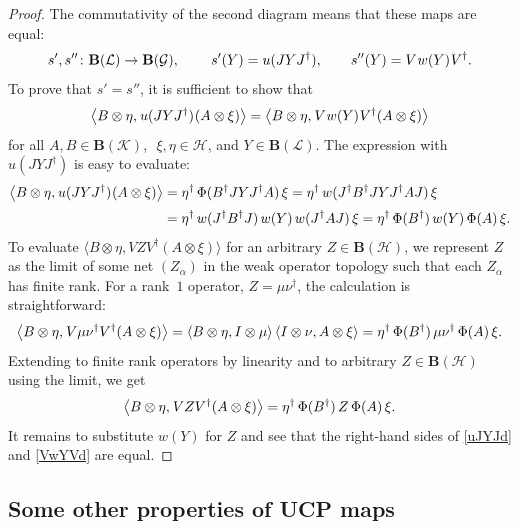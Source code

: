 \documentclass[12pt]{article}
\newcommand{\calG}{\mathcal{G}}
\newcommand{\calH}{\mathcal{H}}
\newcommand{\calK}{\mathcal{K}}
\newcommand{\calL}{\mathcal{L}}
\newcommand{\ts}{\mkern1mu}
\newcommand{\Bo}{\mathbf{B}}
\newcommand{\blangle}{\bigl\langle}
\newcommand{\brangle}{\bigr\rangle}
\newcommand*{\braket}[2]{\langle{#1},{#2}\rangle}
\newcommand*{\bbraket}[2]{\blangle{#1},\mkern1mu{#2}\brangle}
\newtheorem[definition]{Definition}[Theorem]{Definition}
\newtheorem[remark]{Example}[Theorem]{Example}
\newtheorem[remark]{Remark}[Theorem]{Remark}
\newtheorem[remark]{Question}[Theorem]{Open question}
\newtheorem*[definition]{definition}{Definition}
\newtheorem*[remark]{example}{Example}
\newtheorem*[remark]{remark}{Remark}
\newtheorem*[remark]{question}{Open question}
\numberwithin{equation}{section}
\begin{document}
\begin{proof}
The commutativity of the second diagram means that these maps are equal:
\begin{equation}
s',s''\colon \Bo(\calL)\to\Bo(\calG),\qquad\:
s'(Y)=u(JYJ^\dag),\qquad s''(Y)=V\ts w(Y)\ts V^\dag.
\end{equation}
To prove that $s'=s''$, it is sufficient to show that
\[
\bbraket{B\otimes\eta}{u(JYJ^\dag)\ts(A\otimes\xi)}
=\bbraket{B\otimes\eta}{V\ts w(Y)\ts V^\dag (A\otimes\xi)}
\]
for all $A,B\in\Bo(\calK)$,\,\, $\xi,\eta\in\calH$, and $Y\in\Bo(\calL)$. The expression with $u(JYJ^\dag)$ is easy to evaluate:
\begin{equation}\label{uJYJd}
\begin{aligned}
\bbraket{B\otimes\eta}{u(JYJ^\dag)\ts(A\otimes\xi)}
&=\eta^\dag\, \Phi(B^\dag JYJ^\dag A)\, \xi
=\eta^\dag\, w(J^\dag B^\dag JYJ^\dag A J)\, \xi\\[2pt]
&=\eta^\dag\, w(J^\dag B^\dag J)\, w(Y)\, w(J^\dag AJ)\, \xi
=\eta^\dag\, \Phi(B^\dag)\, w(Y)\, \Phi(A)\, \xi.
\end{aligned}
\end{equation}
To evaluate $\braket{B\otimes\eta}{VZV^\dag(A\otimes\xi)}$ for an arbitrary $Z\in\Bo(\calH)$, we represent $Z$ as the limit of some net $(Z_\alpha)$ in the weak operator topology such that each $Z_\alpha$ has finite rank. For a rank~$1$ operator, $Z=\mu\nu^\dag$, the calculation is straightforward:
\[
\bbraket{B\otimes\eta}{V\mu\nu^\dag V^\dag(A\otimes\xi)}
=\braket{B\otimes\eta}{I\otimes\mu}\,\braket{I\otimes\nu}{A\otimes\xi}
=\eta^\dag\,\Phi(B^\dag)\, \mu\nu^\dag\, \Phi(A)\,\xi.
\]
Extending to finite rank operators by linearity and to arbitrary $Z\in\Bo(\calH)$ using the limit, we get
\begin{equation}\label{VwYVd}
\bbraket{B\otimes\eta}{VZV^\dag(A\otimes\xi)}
=\eta^\dag\,\Phi(B^\dag)\, Z\, \Phi(A)\,\xi.
\end{equation}
It remains to substitute $w(Y)$ for $Z$ and see that the right-hand sides of \eqref{uJYJd} and \eqref{VwYVd} are equal.
\end{proof}

\subsection{Some other properties of UCP maps}
\end{document}
